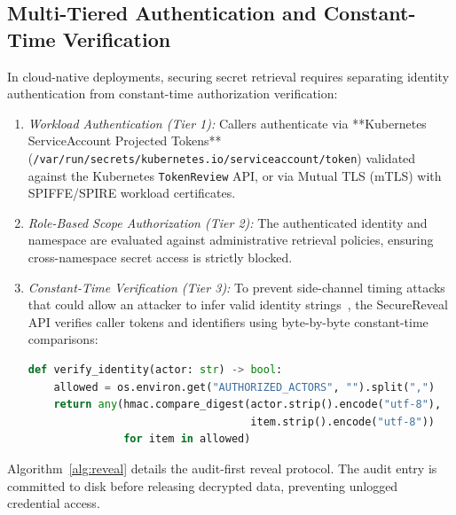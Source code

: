\documentclass[conference]{IEEEtran}
\begin{document}
\subsection{Multi-Tiered Authentication and Constant-Time Verification}
In cloud-native deployments, securing secret retrieval requires separating identity authentication from constant-time authorization verification:
\begin{enumerate}
    \item \textit{Workload Authentication (Tier 1):} Callers authenticate via **Kubernetes ServiceAccount Projected Tokens** (\texttt{/var/run/secrets/kubernetes.io/serviceaccount/token}) validated against the Kubernetes \texttt{TokenReview} API, or via Mutual TLS (mTLS) with SPIFFE/SPIRE workload certificates.
    \item \textit{Role-Based Scope Authorization (Tier 2):} The authenticated identity and namespace are evaluated against administrative retrieval policies, ensuring cross-namespace secret access is strictly blocked.
    \item \textit{Constant-Time Verification (Tier 3):} To prevent side-channel timing attacks that could allow an attacker to infer valid identity strings~\cite{khoje2023securing}, the SecureReveal API verifies caller tokens and identifiers using byte-by-byte constant-time comparisons:
\begin{lstlisting}[language=Python]
def verify_identity(actor: str) -> bool:
    allowed = os.environ.get("AUTHORIZED_ACTORS", "").split(",")
    return any(hmac.compare_digest(actor.strip().encode("utf-8"), 
                                   item.strip().encode("utf-8")) 
               for item in allowed)
\end{lstlisting}
\end{enumerate}

Algorithm~\ref{alg:reveal} details the audit-first reveal protocol. The audit entry is committed to disk before releasing decrypted data, preventing unlogged credential access.
\end{document}
